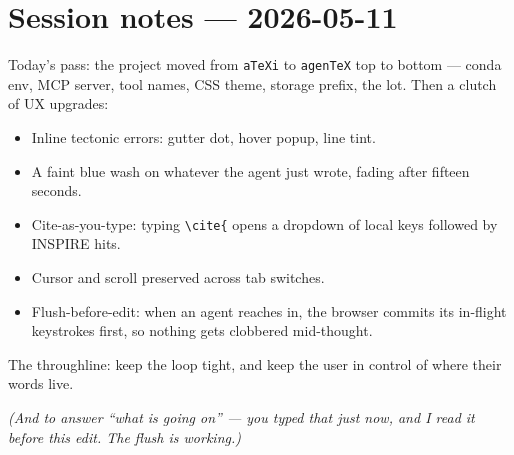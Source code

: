 \documentclass[11pt]{article}
\begin{document}
\section*{Session notes --- 2026-05-11}

Today's pass: the project moved from \texttt{aTeXi} to \texttt{agenTeX} top to bottom --- conda env, MCP server, tool names, CSS theme, storage prefix, the lot. Then a clutch of UX upgrades:
\begin{itemize}
  \item Inline tectonic errors: gutter dot, hover popup, line tint.
  \item A faint blue wash on whatever the agent just wrote, fading after fifteen seconds.
  \item Cite-as-you-type: typing \verb|\cite{| opens a dropdown of local keys followed by INSPIRE hits.
  \item Cursor and scroll preserved across tab switches.
  \item Flush-before-edit: when an agent reaches in, the browser commits its in-flight keystrokes first, so nothing gets clobbered mid-thought.
\end{itemize}

The throughline: keep the loop tight, and keep the user in control of where their words live.

\medskip\noindent\emph{(And to answer ``what is going on'' --- you typed that just now, and I read it before this edit. The flush is working.)}
\end{document}
